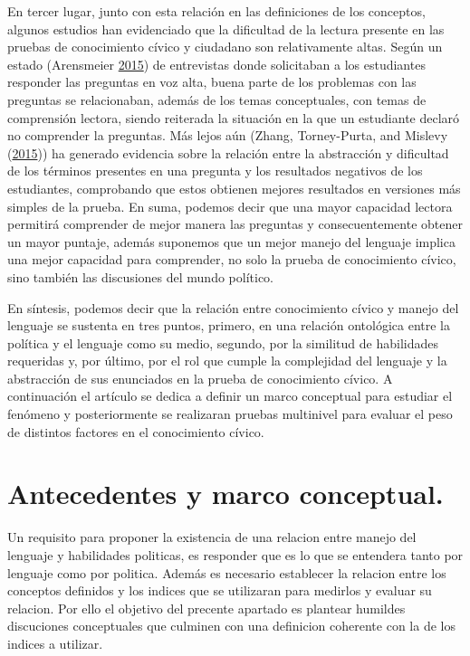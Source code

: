\documentclass[
]{article}
\begin{document}
En tercer lugar, junto con esta relación en las definiciones de los
conceptos, algunos estudios han evidenciado que la dificultad de la
lectura presente en las pruebas de conocimiento cívico y ciudadano son
relativamente altas. Según un estado (Arensmeier
\protect\hyperlink{ref-arensmeierSwedishStudentsConceptual2015}{2015})
de entrevistas donde solicitaban a los estudiantes responder las
preguntas en voz alta, buena parte de los problemas con las preguntas se
relacionaban, además de los temas conceptuales, con temas de comprensión
lectora, siendo reiterada la situación en la que un estudiante declaró
no comprender la preguntas. Más lejos aún (Zhang, Torney-Purta, and
Mislevy
(\protect\hyperlink{ref-zhangUnderstandingCivicCognitive2015}{2015})) ha
generado evidencia sobre la relación entre la abstracción y dificultad
de los términos presentes en una pregunta y los resultados negativos de
los estudiantes, comprobando que estos obtienen mejores resultados en
versiones más simples de la prueba. En suma, podemos decir que una mayor
capacidad lectora permitirá comprender de mejor manera las preguntas y
consecuentemente obtener un mayor puntaje, además suponemos que un mejor
manejo del lenguaje implica una mejor capacidad para comprender, no solo
la prueba de conocimiento cívico, sino también las discusiones del mundo
político.

En síntesis, podemos decir que la relación entre conocimiento cívico y
manejo del lenguaje se sustenta en tres puntos, primero, en una relación
ontológica entre la política y el lenguaje como su medio, segundo, por
la similitud de habilidades requeridas y, por último, por el rol que
cumple la complejidad del lenguaje y la abstracción de sus enunciados en
la prueba de conocimiento cívico. A continuación el artículo se dedica a
definir un marco conceptual para estudiar el fenómeno y posteriormente
se realizaran pruebas multinivel para evaluar el peso de distintos
factores en el conocimiento cívico.

\hypertarget{antecedentes-y-marco-conceptual.}{%
\section{Antecedentes y marco
conceptual.}\label{antecedentes-y-marco-conceptual.}}

Un requisito para proponer la existencia de una relacion entre manejo
del lenguaje y habilidades politicas, es responder que es lo que se
entendera tanto por lenguaje como por politica. Además es necesario
establecer la relacion entre los conceptos definidos y los indices que
se utilizaran para medirlos y evaluar su relacion. Por ello el objetivo
del precente apartado es plantear humildes discuciones conceptuales que
culminen con una definicion coherente con la de los indices a utilizar.
\end{document}
